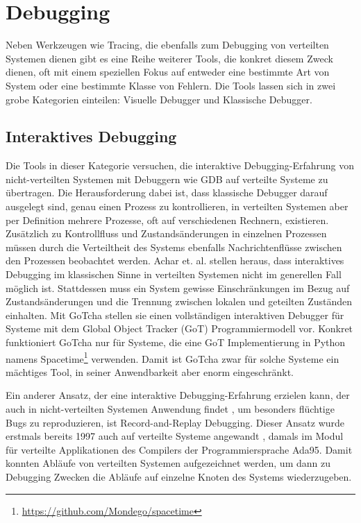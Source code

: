 \documentclass[12pt,a4paper]{report}
\begin{document}
\section{Debugging}
Neben Werkzeugen wie Tracing, die ebenfalls zum Debugging von verteilten Systemen dienen gibt es eine Reihe weiterer Tools, die
konkret diesem Zweck dienen, oft mit einem speziellen Fokus auf entweder eine bestimmte Art von System oder eine bestimmte
Klasse von Fehlern. Die Tools lassen sich in zwei grobe Kategorien einteilen: Visuelle Debugger und Klassische Debugger.

\subsection{Interaktives Debugging}
Die Tools in dieser Kategorie versuchen, die interaktive Debugging-Erfahrung von nicht-verteilten Systemen mit Debuggern wie GDB
auf verteilte Systeme zu übertragen. Die Herausforderung dabei ist, dass klassische Debugger darauf ausgelegt sind, genau einen
Prozess zu kontrollieren, in verteilten Systemen aber per Definition mehrere Prozesse, oft auf verschiedenen Rechnern, existieren.
Zusätzlich zu Kontrollfluss und Zustandsänderungen in einzelnen Prozessen müssen durch die Verteiltheit des Systems ebenfalls
Nachrichtenflüsse zwischen den Prozessen beobachtet werden. Achar et. al. \cite{gotcha_interactive_debugger} stellen heraus, dass
interaktives Debugging im klassischen Sinne in verteilten Systemen nicht im generellen Fall möglich ist. Stattdessen muss ein
System gewisse Einschränkungen im Bezug auf Zustandsänderungen und die Trennung zwischen lokalen und geteilten Zuständen
einhalten. Mit GoTcha \cite{gotcha_interactive_debugger} stellen sie einen vollständigen interaktiven Debugger für Systeme mit dem
Global Object Tracker (GoT) Programmiermodell vor. Konkret funktioniert GoTcha nur für Systeme, die eine GoT Implementierung in
Python namens Spacetime\footnote{\url{https://github.com/Mondego/spacetime}} verwenden. Damit ist GoTcha zwar für solche Systeme
ein mächtiges Tool, in seiner Anwendbarkeit aber enorm eingeschränkt.

Ein anderer Ansatz, der eine interaktive Debugging-Erfahrung erzielen kann, der auch in nicht-verteilten Systemen Anwendung findet
\cite{normal_record_and_replay}, um besonders flüchtige Bugs zu reproduzieren, ist Record-and-Replay Debugging. Dieser Ansatz
wurde erstmals bereits 1997 auch auf verteilte Systeme angewandt \cite{distributed_replay_debugging_1997}, damals im Modul für
verteilte Applikationen des Compilers der Programmiersprache Ada95. Damit konnten Abläufe von verteilten Systemen aufgezeichnet
werden, um dann zu Debugging Zwecken die Abläufe auf einzelne Knoten des Systems wiederzugeben.
\end{document}
